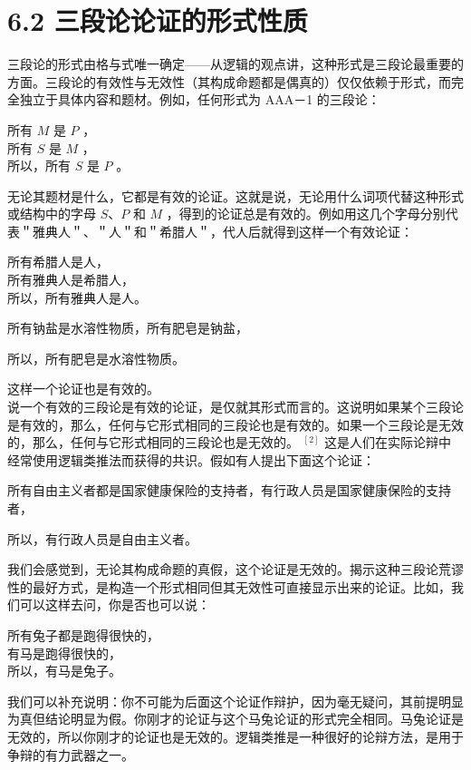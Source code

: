\section*{6.2 三段论论证的形式性质}
三段论的形式由格与式唯一确定——从逻辑的观点讲，这种形式是三段论最重要的方面。三段论的有效性与无效性（其构成命题都是偶真的）仅仅依赖于形式，而完全独立于具体内容和题材。例如，任何形式为 AAA－1 的三段论：

\begin{displayquote}
所有 $M$ 是 $P$ ，\\
所有 $S$ 是 $M$ ，\\
所以，所有 $S$ 是 $P$ 。
\end{displayquote}

无论其题材是什么，它都是有效的论证。这就是说，无论用什么词项代替这种形式或结构中的字母 $S 、 P$ 和 $M$ ，得到的论证总是有效的。例如用这几个字母分别代表＂雅典人＂、＂人＂和＂希腊人＂，代人后就得到这样一个有效论证：

\begin{displayquote}
所有希腊人是人，\\
所有雅典人是希腊人，\\
所以，所有雅典人是人。
\end{displayquote}

所有钠盐是水溶性物质，所有肥皂是钠盐，

所以，所有肥皂是水溶性物质。

这样一个论证也是有效的。\\
说一个有效的三段论是有效的论证，是仅就其形式而言的。这说明如果某个三段论是有效的，那么，任何与它形式相同的三段论也是有效的。如果一个三段论是无效的，那么，任何与它形式相同的三段论也是无效的。 ${ }^{[2]}$ 这是人们在实际论辩中经常使用逻辑类推法而获得的共识。假如有人提出下面这个论证：

所有自由主义者都是国家健康保险的支持者，有行政人员是国家健康保险的支持者，

所以，有行政人员是自由主义者。

我们会感觉到，无论其构成命题的真假，这个论证是无效的。揭示这种三段论荒谬性的最好方式，是构造一个形式相同但其无效性可直接显示出来的论证。比如，我们可以这样去问，你是否也可以说：

所有兔子都是跑得很快的，\\
有马是跑得很快的，\\
所以，有马是兔子。

我们可以补充说明：你不可能为后面这个论证作辩护，因为毫无疑问，其前提明显为真但结论明显为假。你刚才的论证与这个马兔论证的形式完全相同。马兔论证是无效的，所以你刚才的论证也是无效的。逻辑类推是一种很好的论辩方法，是用于争辩的有力武器之一。

